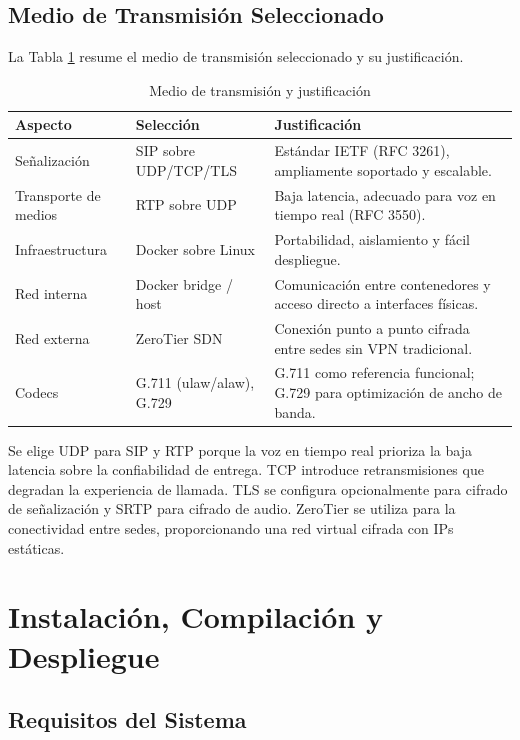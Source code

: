 \documentclass[12pt,a4paper]{article}
\begin{document}
\subsection{Medio de Transmisión Seleccionado}

La Tabla \ref{tab:medio} resume el medio de transmisión seleccionado y su justificación.

\begin{table}[H]
\centering
\caption{Medio de transmisión y justificación}
\label{tab:medio}
\begin{tabular}{@{}p{3.5cm}p{4cm}p{6cm}@{}}
\toprule
\textbf{Aspecto} & \textbf{Selección} & \textbf{Justificación} \\
\midrule
Señalización & SIP sobre UDP/TCP/TLS & Estándar IETF (RFC 3261), ampliamente soportado y escalable. \\
Transporte de medios & RTP sobre UDP & Baja latencia, adecuado para voz en tiempo real (RFC 3550). \\
Infraestructura & Docker sobre Linux & Portabilidad, aislamiento y fácil despliegue. \\
Red interna & Docker bridge / host & Comunicación entre contenedores y acceso directo a interfaces físicas. \\
Red externa & ZeroTier SDN & Conexión punto a punto cifrada entre sedes sin VPN tradicional. \\
Codecs & G.711 (ulaw/alaw), G.729 & G.711 como referencia funcional; G.729 para optimización de ancho de banda. \\
\bottomrule
\end{tabular}
\end{table}

Se elige UDP para SIP y RTP porque la voz en tiempo real prioriza la baja latencia sobre la confiabilidad de entrega. TCP introduce retransmisiones que degradan la experiencia de llamada. TLS se configura opcionalmente para cifrado de señalización y SRTP para cifrado de audio. ZeroTier se utiliza para la conectividad entre sedes, proporcionando una red virtual cifrada con IPs estáticas.

\section{Instalación, Compilación y Despliegue}

\subsection{Requisitos del Sistema}
\end{document}
